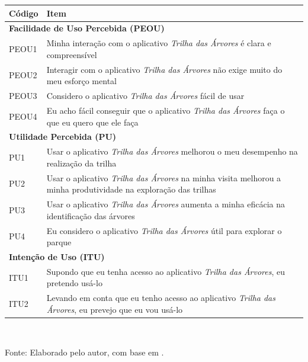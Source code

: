 \begin{quadro}[htb]
\centering
\caption{Itens do instrumento baseado no Technology Acceptance Model}
\label{quad:tam}
\footnotesize
\begin{tabular}{p{1.4cm} p{11.4cm}}
\toprule
\textbf{Código} & \textbf{Item} \\
\midrule
\multicolumn{2}{l}{\textbf{Facilidade de Uso Percebida (PEOU)}} \\
\midrule
PEOU1 & Minha interação com o aplicativo \textit{Trilha das Árvores} é clara e
compreensível \\
PEOU2 & Interagir com o aplicativo \textit{Trilha das Árvores} não exige muito do
meu esforço mental \\
PEOU3 & Considero o aplicativo \textit{Trilha das Árvores} fácil de usar \\
PEOU4 & Eu acho fácil conseguir que o aplicativo \textit{Trilha das Árvores} faça
o que eu quero que ele faça \\
\midrule
\multicolumn{2}{l}{\textbf{Utilidade Percebida (PU)}} \\
\midrule
PU1 & Usar o aplicativo \textit{Trilha das Árvores} melhorou o meu desempenho na
realização da trilha\footnotemark \\
PU2 & Usar o aplicativo \textit{Trilha das Árvores} na minha visita melhorou a
minha produtividade na exploração das trilhas \\
PU3 & Usar o aplicativo \textit{Trilha das Árvores} aumenta a minha eficácia na
identificação das árvores \\
PU4 & Eu considero o aplicativo \textit{Trilha das Árvores} útil para explorar o
parque \\
\midrule
\multicolumn{2}{l}{\textbf{Intenção de Uso (ITU)}} \\
\midrule
ITU1 & Supondo que eu tenha acesso ao aplicativo \textit{Trilha das Árvores}, eu
pretendo usá-lo \\
ITU2 & Levando em conta que eu tenho acesso ao aplicativo \textit{Trilha das
Árvores}, eu prevejo que eu vou usá-lo \\
\bottomrule
\end{tabular}
\\[4pt]
\begin{flushleft}
Fonte: Elaborado pelo autor, com base em .
\end{flushleft}
\end{quadro}


